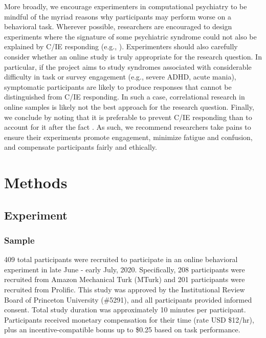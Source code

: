 \documentclass[a4paper,notitlepage,12pt]{article}
\begin{document}
More broadly, we encourage experimenters in computational psychiatry to be mindful of the myriad reasons why participants may perform worse on a behavioral task. Wherever possible, researchers are encouraged to design experiments where the signature of some psychiatric syndrome could not also be explained by C/IE responding (e.g., \cite{eldar2015interaction, hunter2022increased}). Experimenters should also carefully consider whether an online study is truly appropriate for the research question. In particular, if the project aims to study syndromes associated with considerable difficulty in task or survey engagement (e.g., severe ADHD, acute mania), symptomatic participants are likely to produce responses that cannot be distinguished from C/IE responding. In such a case, correlational research in online samples is likely not the best approach for the research question. Finally, we conclude by noting that it is preferable to prevent C/IE responding than to account for it after the fact \cite{ward2018applying}. As such, we recommend researchers take pains to ensure their experiments promote engagement, minimize fatigue and confusion, and compensate participants fairly and ethically.

\section*{Methods}

\subsection*{Experiment}

\subsubsection*{Sample}

409 total participants were recruited to participate in an online behavioral experiment in late June - early July, 2020. Specifically, 208 participants were recruited from Amazon Mechanical Turk (MTurk) and 201 participants were recruited from Prolific. This study was approved by the Institutional Review Board of Princeton University (\#5291), and all participants provided informed consent. Total study duration was approximately 10 minutes per participant. Participants received monetary compensation for their time (rate USD \$12/hr), plus an incentive-compatible bonus up to \$0.25 based on task performance. 
\end{document}

